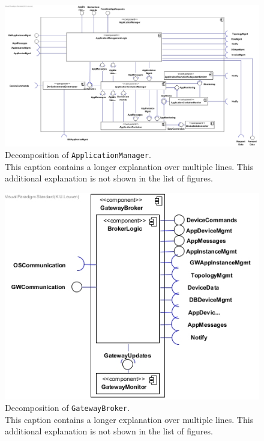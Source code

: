 \begin{figure}[!htp]
	\centering
	\includegraphics[width=\textwidth]{images/component-diagram-ApplicationManager}
	\caption[Decomposition of \texttt{ApplicationManager}]{Decomposition of \texttt{ApplicationManager}.\\
	This caption contains a longer explanation over multiple lines. This additional explanation is not shown in the list of figures.}\label{fig:decomp-component2}
\end{figure}


\begin{figure}[!htp]
	\centering
	\includegraphics[width=\textwidth]{images/component-diagram-GatewayBroker}
	\caption[Decomposition of \texttt{GatewayBroker}]{Decomposition of \texttt{GatewayBroker}.\\
	This caption contains a longer explanation over multiple lines. This additional explanation is not shown in the list of figures.}\label{fig:decomp-component3}
\end{figure}


